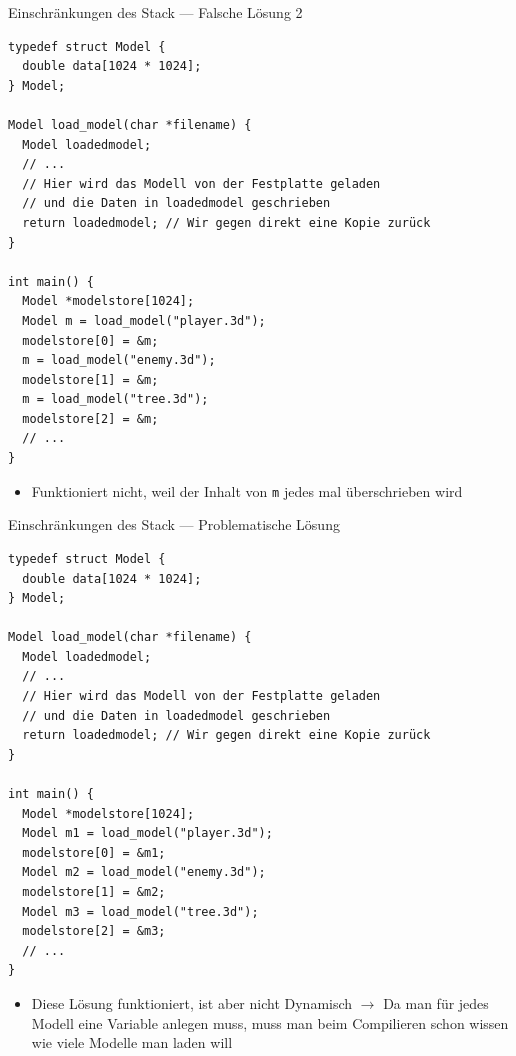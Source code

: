 \documentclass[presentation]{beamer}
\begin{document}
\begin{frame}[label={sec:org087bb6e},fragile]{Einschränkungen des Stack --- Falsche Lösung 2}
 \begin{verbatim}
typedef struct Model {
  double data[1024 * 1024];
} Model;

Model load_model(char *filename) {
  Model loadedmodel;
  // ...
  // Hier wird das Modell von der Festplatte geladen
  // und die Daten in loadedmodel geschrieben
  return loadedmodel; // Wir gegen direkt eine Kopie zurück
}

int main() {
  Model *modelstore[1024];
  Model m = load_model("player.3d");
  modelstore[0] = &m;
  m = load_model("enemy.3d");
  modelstore[1] = &m;
  m = load_model("tree.3d");
  modelstore[2] = &m;
  // ...
}
\end{verbatim}
\begin{itemize}
\item Funktioniert nicht, weil der Inhalt von {\color{solarizedYellow}\texttt{m} }jedes mal überschrieben
wird
\end{itemize}
\end{frame}
\begin{frame}[label={sec:org86e23f9},fragile]{Einschränkungen des Stack --- Problematische Lösung}
 \begin{verbatim}
typedef struct Model {
  double data[1024 * 1024];
} Model;

Model load_model(char *filename) {
  Model loadedmodel;
  // ...
  // Hier wird das Modell von der Festplatte geladen
  // und die Daten in loadedmodel geschrieben
  return loadedmodel; // Wir gegen direkt eine Kopie zurück
}

int main() {
  Model *modelstore[1024];
  Model m1 = load_model("player.3d");
  modelstore[0] = &m1;
  Model m2 = load_model("enemy.3d");
  modelstore[1] = &m2;
  Model m3 = load_model("tree.3d");
  modelstore[2] = &m3;
  // ...
}
\end{verbatim}
\footnotesize
\begin{itemize}
\item Diese Lösung funktioniert, ist aber nicht Dynamisch \(\rightarrow\) Da
man für jedes Modell eine Variable anlegen muss, muss man beim
Compilieren schon wissen wie viele Modelle man laden will
\end{itemize}
\end{frame}
\end{document}
